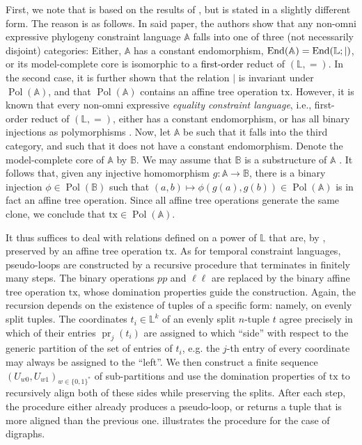 \documentclass[a4paper,reqno, cleveref]{amsart}
\newcommand{\struct}[1]{\mathbb{#1}}
\DeclareMathOperator{\Pol}{Pol}
\DeclareMathOperator{\pr}{pr}
\DeclareMathOperator{\End}{End}
\newcommand{\sA}{\mathbb A}
\newcommand{\sB}{\mathbb B}
\newcommand{\sL}{\mathbb L}
\newcommand{\Phylo}[1]{\ensuremath{(\struct{L};|)}#1}
\newcommand{\tx}{\ensuremath{\mathrm{tx}}\xspace}
\newcommand\mo[1]{\textcolor{black}{#1}} %
\begin{document}
First, we note that  is based on the results of \cite{Phylo-Complexity}, but is stated in a slightly different form. The reason is as follows.
%
 In said paper, the authors show that any non-omni expressive phylogeny constraint language $\sA$ falls into one of three (not necessarily disjoint) categories: Either, $\sA$ has a constant endomorphism, $\End(\sA)=\End\Phylo$, or its model-complete core is isomorphic to a \mo{first-order} reduct of $(\sL,=)$. 
%
In the second case, it is further shown that the relation $|$ is invariant under $\Pol(\sA)$, and that $\Pol(\sA)$ contains an affine tree operation $\tx$.
%
However, it is known that every non-omni expressive \emph{equality constraint language}, i.e., first-order reduct of $(\sL,=)$, either has a constant endomorphism, or has all binary injections as polymorphisms \cite{ecsps}. 
%
Now, let $\sA$ be such that it falls into the third category, and such that it does not have a constant endomorphism. 
%
Denote the model-complete core of $\sA$ by $\sB$. 
%
We may assume that $\sB$ is a substructure of $\sA$ \cite[cf. Remark 4.7.5]{Book}.
% 
It follows that, given any injective homomorphism $g\colon\sA\rightarrow\sB$, there is a binary injection $\phi\in\Pol(\sB)$ such that $(a,b)\mapsto\phi(g(a),g(b))\in\Pol(\sA)$ is in fact an affine tree operation. Since all affine tree operations generate the same clone, we conclude that $\tx\in\Pol(\sA)$.

It thus suffices to deal with relations defined on a power of $\sL$ that are, by , preserved by an affine tree operation $\tx$.  As for temporal constraint languages, pseudo-loops are constructed by a recursive procedure that terminates in finitely many steps. The binary operations $pp$ and $\ell \ell$
 are replaced by the binary affine tree operation 
$\tx$, whose domination properties guide the construction. Again, the recursion depends on the existence of tuples of a specific form: namely, on evenly split tuples. %
The coordinates $t_i\in \sL^k$ of an evenly split $n$-tuple $t$ agree precisely in which of their entries $\pr_j(t_i)$ are assigned to which ``side'' with respect to the  generic partition of the set of entries of $t_i$, e.g. the $j$-th entry of every coordinate may always be assigned to the ``left''. We then construct a finite sequence $(U_{w0}, U_{w1})_{w\in\{0,1\}^{\ast} }$ of sub-partitions and use the domination properties of $\tx$  to  recursively align both of these sides while preserving the  splits. 
After each step, the procedure either already produces a pseudo-loop, or returns a tuple that is more aligned than the previous one.  illustrates the procedure for the case of digraphs.  
\end{document}

